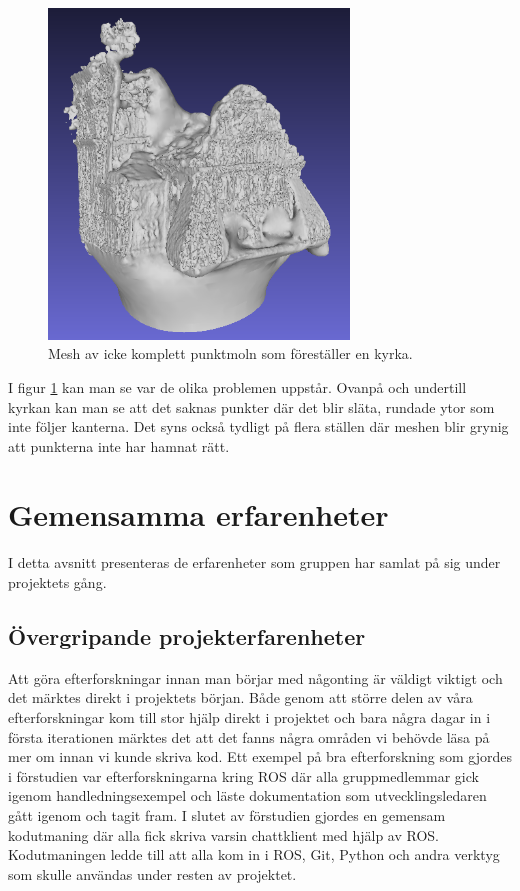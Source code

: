 \begin{figure}[H]
	\centering
	\includegraphics[width=80mm]{figures/3DCopyMeshChurch.PNG}
	\caption{Mesh av icke komplett punktmoln som föreställer en kyrka.}
	\label{fig:3dcopy_mesh_church}
\end{figure}
\label{cha:results_experiences}

I figur \ref{fig:3dcopy_mesh_church} kan man se var de olika problemen uppstår. Ovanpå och undertill kyrkan kan man se att det saknas punkter där det blir släta, rundade ytor som inte följer kanterna. Det syns också tydligt på flera ställen där meshen blir grynig att punkterna inte har hamnat rätt.

\section{Gemensamma erfarenheter}

I detta avsnitt presenteras de erfarenheter som gruppen har samlat på sig under projektets gång.

\subsection{Övergripande projekterfarenheter}

Att göra efterforskningar innan man börjar med någonting är väldigt viktigt och det märktes direkt i projektets början. Både genom att större delen av våra efterforskningar kom till stor hjälp direkt i projektet och bara några dagar in i första iterationen märktes det att det fanns några områden vi behövde läsa på mer om innan vi kunde skriva kod. Ett exempel på bra efterforskning som gjordes i förstudien var efterforskningarna kring ROS där alla gruppmedlemmar gick igenom handledningsexempel och läste dokumentation som utvecklingsledaren gått igenom och tagit fram. I slutet av förstudien gjordes en gemensam kodutmaning där alla fick skriva varsin chattklient med hjälp av ROS. Kodutmaningen ledde till att alla kom in i ROS, Git, Python och andra verktyg som skulle användas under resten av projektet.


